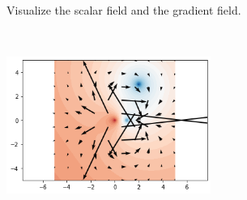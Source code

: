 Visualize the scalar field and the gradient field.

\begin{solution}\
\begin{center}
    \includegraphics[width=0.5\textwidth]{img/e11p2.png}
\end{center}
\end{solution}